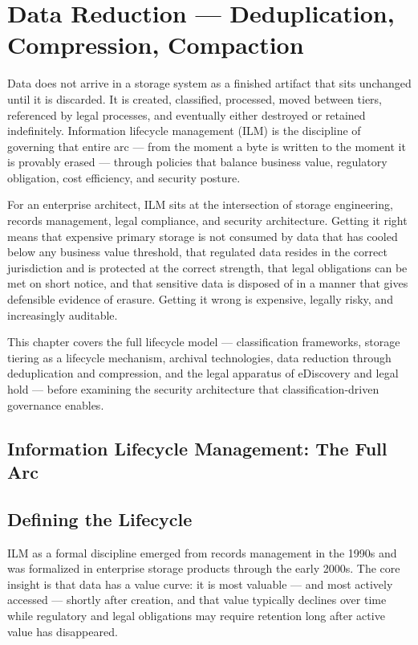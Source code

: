 \chapter{Data Reduction --- Deduplication, Compression, Compaction}
\label{ch:13}

Data does not arrive in a storage system as a finished artifact that sits unchanged until it is discarded. It is created, classified, processed, moved between tiers, referenced by legal processes, and eventually either destroyed or retained indefinitely. Information lifecycle management (ILM) is the discipline of governing that entire arc --- from the moment a byte is written to the moment it is provably erased --- through policies that balance business value, regulatory obligation, cost efficiency, and security posture.

For an enterprise architect, ILM sits at the intersection of storage engineering, records management, legal compliance, and security architecture. Getting it right means that expensive primary storage is not consumed by data that has cooled below any business value threshold, that regulated data resides in the correct jurisdiction and is protected at the correct strength, that legal obligations can be met on short notice, and that sensitive data is disposed of in a manner that gives defensible evidence of erasure. Getting it wrong is expensive, legally risky, and increasingly auditable.

This chapter covers the full lifecycle model --- classification frameworks, storage tiering as a lifecycle mechanism, archival technologies, data reduction through deduplication and compression, and the legal apparatus of eDiscovery and legal hold --- before examining the security architecture that classification-driven governance enables.

\section{Information Lifecycle Management: The Full Arc}
\section{Defining the Lifecycle}
ILM as a formal discipline emerged from records management in the 1990s and was formalized in enterprise storage products through the early 2000s. The core insight is that data has a value curve: it is most valuable --- and most actively accessed --- shortly after creation, and that value typically declines over time while regulatory and legal obligations may require retention long after active value has disappeared.

